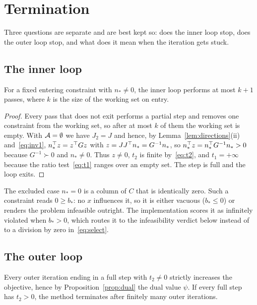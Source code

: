 \section{Termination}
\label{sec:termination}

Three questions are separate and are best kept so: does the inner loop stop, does
the outer loop stop, and what does it mean when the iteration gets stuck.

\subsection{The inner loop}

\begin{proposition}\label{prop:inner}
For a fixed entering constraint with $n_* \neq 0$, the inner loop performs at
most $k+1$ passes, where $k$ is the size of the working set on entry.
\end{proposition}

\begin{proof}
Every pass that does not exit performs a partial step and removes one constraint
from the working set, so after at most $k$ of them the working set is empty. With
$\mathcal{A} = \emptyset$ we have $J_2 = J$ and hence, by
Lemma~\ref{lem:directions}(ii) and~\eqref{eq:inv1},
$n_*^{\top} z = z^{\top} G z$ with $z = J J^{\top} n_* = G^{-1}n_*$, so
$n_*^{\top} z = n_*^{\top} G^{-1} n_* > 0$ because $G^{-1} \succ 0$ and $n_* \neq 0$. Thus
$z \neq 0$, $t_2$ is finite by~\eqref{eq:t2}, and $t_1 = +\infty$ because the
ratio test~\eqref{eq:t1} ranges over an empty set. The step is full and the loop
exits.
\end{proof}

The excluded case $n_* = 0$ is a column of $C$ that is identically zero. Such a
constraint reads $0 \ge b_*$: no $x$ influences it, so it is either vacuous
($b_* \le 0$) or renders the problem infeasible outright. The implementation
scores it as infinitely violated when $b_* > 0$, which routes it to the
infeasibility verdict below instead of to a division by zero
in~\eqref{eq:select}.

\subsection{The outer loop}

\begin{proposition}\label{prop:ascent}
Every outer iteration ending in a full step with $t_2 \neq 0$ strictly increases
the objective, hence by Proposition~\ref{prop:dual} the dual value $\psi$. If every
full step has $t_2 > 0$, the method terminates after finitely many outer
iterations.
\end{proposition}


